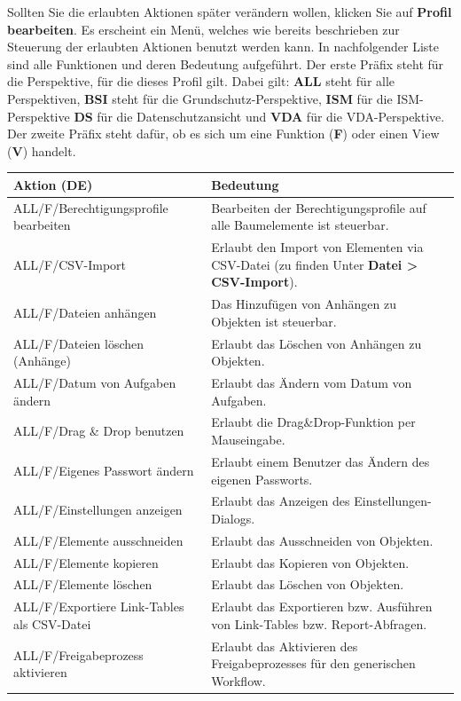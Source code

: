 \documentclass[a4paper,10pt]{book}
\begin{document}
Sollten Sie die erlaubten Aktionen später verändern wollen, klicken Sie auf
\textbf{Profil bearbeiten}. Es erscheint ein Menü, welches wie bereits
beschrieben zur Steuerung der erlaubten Aktionen benutzt werden kann. In
nachfolgender Liste sind alle Funktionen und deren Bedeutung aufgeführt. Der
erste Präfix steht für die Perspektive, für die dieses Profil gilt. Dabei gilt:
\textbf{ALL} steht für alle Perspektiven, \textbf{BSI} steht für die
Grundschutz-Perspektive, \textbf{ISM} für die ISM-Perspektive \textbf{DS} für
die Datenschutzansicht und \textbf{VDA} für die VDA-Perspektive. Der zweite
Präfix steht dafür, ob es sich um eine Funktion (\textbf{F}) oder einen View
(\textbf{V}) handelt.
\begin{longtable}{| p{5cm} | p{6cm} |}
\hline
\textbf{Aktion (DE)} & \textbf{Bedeutung}  \\[10pt] \hline
ALL/F/Berechtigungsprofile bearbeiten & Bearbeiten der Berechtigungsprofile auf
alle Baumelemente ist steuerbar. \\[10pt] \hline
ALL/F/CSV-Import & Erlaubt den Import von Elementen via CSV-Datei (zu finden
Unter \textbf{Datei > CSV-Import}). \\[10pt] \hline
ALL/F/Dateien anhängen & Das Hinzufügen von Anhängen zu Objekten ist steuerbar.
\\[10pt] \hline
ALL/F/Dateien löschen (Anhänge) & Erlaubt das Löschen von Anhängen zu
Objekten. \\[10pt] \hline
ALL/F/Datum von Aufgaben ändern & Erlaubt das Ändern vom Datum von Aufgaben.
\\[10pt] \hline
ALL/F/Drag \& Drop benutzen & Erlaubt die Drag\&Drop-Funktion per Mauseingabe.
\\[10pt] \hline
ALL/F/Eigenes Passwort ändern & Erlaubt einem Benutzer das Ändern des eigenen
Passworts.\\[10pt] \hline
ALL/F/Einstellungen anzeigen & Erlaubt das Anzeigen des Einstellungen-Dialogs.
\\[10pt] \hline
ALL/F/Elemente ausschneiden & Erlaubt das Ausschneiden von Objekten. \\[10pt]
\hline
ALL/F/Elemente kopieren & Erlaubt das Kopieren von Objekten. \\[10pt] \hline
ALL/F/Elemente löschen & Erlaubt das Löschen von Objekten. \\[10pt] \hline
ALL/F/Exportiere Link-Tables als CSV-Datei & Erlaubt das Exportieren bzw.
Ausführen von Link-Tables bzw. Report-Abfragen. \\[10pt] \hline
ALL/F/Freigabeprozess akti\-vie\-ren & Erlaubt das Aktivieren des Freigabeprozesses für den generischen Workflow. \\[10pt]\hline

\end{longtable}
\end{document}
